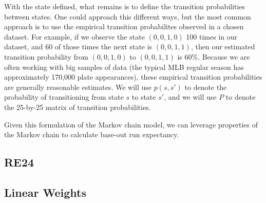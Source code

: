 \documentclass{article}
\begin{document}
      With the state defined, what remains is to define the transition probabilities between states. One could approach this different ways, but the most common approach is to use the empirical transition probabilites observed in a chosen dataset. For example, if we observe the state $(0, 0, 1, 0)$ 100 times in our dataset, and 60 of those times the next state is $(0, 0, 1, 1)$, then our estimated transition probability from $(0, 0, 1, 0)$ to $(0, 0, 1, 1)$ is 60\%. Because we are often working with big samples of data (the typical MLB regular season has approximately 170,000 plate appearances), these empirical transition probabilities are generally reasonable estimates. We will use $p(s, s')$ to denote the probability of transitioning from state $s$ to state $s'$, and we will use $P$ to denote the 25-by-25 matrix of transition probabilities.

      Given this formulation of the Markov chain model, we can leverage properties of the Markov chain to calculate base-out run expectancy.

    \subsection{\sc RE24}

    \subsection{\sc Linear Weights}
\end{document}

